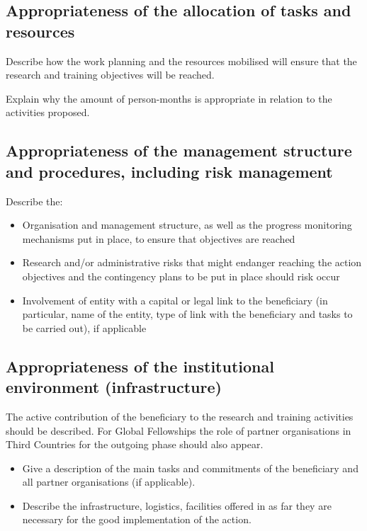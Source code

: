 \subsection{Appropriateness of the allocation of tasks and resources }
\label{sec:implementation_resources}

Describe how the work planning and the resources mobilised will ensure that the research and training objectives will be reached. 

\medskip\noindent
Explain why the amount of person-months is appropriate in relation to the activities proposed.





\subsection{Appropriateness of the management structure and procedures, including risk management}
\label{sec:implementation_management}

Describe the: 

\begin{itemize}
	\item Organisation and management structure, as well as the progress monitoring mechanisms put in place, to ensure that objectives are reached
	\item Research and/or administrative risks that might endanger reaching the action objectives and the contingency plans to be put in place should risk occur
	\item Involvement of entity with a capital or legal link to the beneficiary (in particular, name of the entity, type of link with the beneficiary and tasks to be carried out), if applicable
\end{itemize}





\subsection{Appropriateness of the institutional environment (infrastructure)}
\label{sec:implementation_infrastructure}

The active contribution of the beneficiary to the research and training activities should be described. For Global Fellowships the role of partner organisations in Third Countries for the outgoing phase should also appear.          

\begin{itemize}
	\item Give a description of the main tasks and commitments of the beneficiary and all partner organisations (if applicable). 
	\item Describe the infrastructure, logistics, facilities offered in as far they are necessary for the good implementation of the action. 
\end{itemize}





\markEndPageLimit
